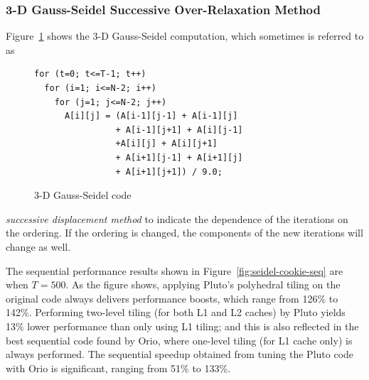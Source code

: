 \subsubsection{3-D Gauss-Seidel Successive Over-Relaxation Method}  
Figure~\ref{fig:seidel-code} shows the 3-D Gauss-Seidel computation, 
which sometimes is referred to as
%
\begin{figure}
\vspace{-0.2in}
\begin{center}
\begin{minipage}{3in} 
\scriptsize
\begin{verbatim} 
for (t=0; t<=T-1; t++) 
  for (i=1; i<=N-2; i++) 
    for (j=1; j<=N-2; j++) 
      A[i][j] = (A[i-1][j-1] + A[i-1][j] 
                + A[i-1][j+1] + A[i][j-1] 
                +A[i][j] + A[i][j+1] 
                + A[i+1][j-1] + A[i+1][j] 
                + A[i+1][j+1]) / 9.0; 
\end{verbatim} 
\end{minipage} 
\end{center}
\vspace{-0.1in}
\caption{3-D Gauss-Seidel code} 
\label{fig:seidel-code} 
\end{figure}
%
\emph{successive displacement method} to indicate the dependence of the iterations on the 
ordering. If the ordering is changed, the components of the new 
iterations will change as well. 
 
The sequential performance results shown in
Figure~\ref{fig:seidel-cookie-seq} are when $T=500$. As the figure
shows, applying Pluto's polyhedral tiling on the original code always
delivers performance boosts, which range from 126\% to
142\%. Performing two-level tiling (for both L1 and L2 caches) by
Pluto yields 13\% lower performance than only using L1 tiling; and
this is also reflected in the best sequential code found by Orio,
where one-level tiling (for L1 cache only) is always performed. The
sequential speedup obtained from tuning the Pluto code with Orio is
significant, ranging from 51\% to 133\%.

